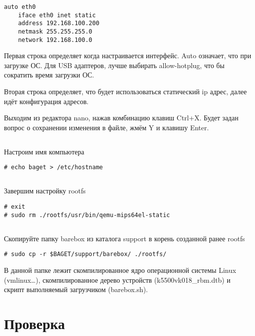 \begin{lstlisting}[style=stdout]
auto eth0
	iface eth0 inet static
	address 192.168.100.200
	netmask 255.255.255.0
	network 192.168.100.0
\end{lstlisting}

Первая строка определяет когда настраивается интерфейс. Auto означает, что при загрузке ОС. 
Для USB адаптеров, лучше выбирать allow-hotplug, что бы сократить время загрузки ОС. 

Вторая строка определяет, что будет использоваться статический ip адрес, 
далее идёт конфигурация адресов.

Выходим из редактора nano, нажав комбинацию клавиш Ctrl+X. Будет задан вопрос о сохранении изменения в файле, жмём Y и клавишу Enter.

\subsection{}Настроим имя компьютера

\begin{lstlisting}[style=bash]
# echo baget > /etc/hostname
\end{lstlisting}

\subsection{}Завершим настройку rootfs

\begin{lstlisting}[style=bash]
# exit
# sudo rm ./rootfs/usr/bin/qemu-mips64el-static
\end{lstlisting}

\subsection{}Скопируйте папку barebox из каталога support в корень созданной ранее rootfs
\begin{lstlisting}[style=bash]
# sudo cp -r $BAGET/support/barebox/ ./rootfs/
\end{lstlisting}

В данной папке лежит скомпилированное ядро операционной системы Linux (vmlinux…), скомпилированное дерево устройств (k5500vk018\_rbm.dtb) и скрипт выполняемый загрузчиком (barebox.sh).

\section{Проверка}

